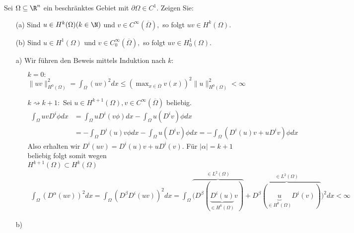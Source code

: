 
\begin{exercise}

  Sei $\Omega \subseteq \R^n$ ein beschränktes Gebiet mit $\partial\Omega \in C^1.$ Zeigen Sie:
  \begin{itemize}
      \item[(a)] Sind $u \in H^k(\Omega) (k \in \N)$ und $v \in C^\infty(\overline{\Omega}),$ so folgt $uv \in H^k(\Omega).$
       \item[(b)] Sind $u \in H^1(\Omega)$ und $v \in C_0^\infty(\overline{\Omega}),$ so folgt $uv \in H^1_0(\Omega).$
  \end{itemize}

\end{exercise}


\begin{solution}

\begin{itemize}
  \item[a)] Wir führen den Beweis mittels Induktion nach $k$:
  \begin{itemize}
    \item[$k = 0:$] $\|uv\|_{H^0(\Omega)}^2 = \int_\Omega (uv)^2 dx \leq
    \left(\max_{x \in \overline{\Omega}}v(x)\right)^2 \|u\|_{H^0(\Omega)}^2 < \infty$
    \item[$k \rightsquigarrow k+1:$] Sei $u \in H^{k+1}(\Omega), v \in C^{\infty}(\overline{\Omega})$
    beliebig.
    \begin{align*}
      \int_\Omega uvD^i\phi dx &= \int_\Omega u D^i(v\phi)dx  - \int_\Omega u(D^i v)\phi dx \\
      &= -\int_\Omega D^i(u)v\phi dx - \int_\Omega u(D^iv)\phi dx
      = -\int_\Omega (D^i(u)v + uD^iv)\phi dx
    \end{align*}
    Also erhalten wir $D^i(uv) = D^i(u)v + uD^i(v)$. Für $|\alpha| = k + 1$ beliebig
    folgt somit wegen \\
    $H^{k+1}(\Omega) \subset H^k(\Omega)$
    \begin{align*}
      \int_\Omega (D^{\alpha}(uv))^2 dx = \int_\Omega (D^\beta D^i (uv))^2 dx
    = \int_\Omega \overbrace{(D^\beta(\underbrace{D^i(u)}_{\in H^k(\Omega)}v)}^{\in L^2(\Omega)}
      + \overbrace{D^\beta(\underbrace{u}_{\in H^k(\Omega)}D^i(v))}^{\in L^2(\Omega)})^2 dx < \infty
    \end{align*}
  \end{itemize}
  \item[b)]
\end{itemize}

\end{solution}


